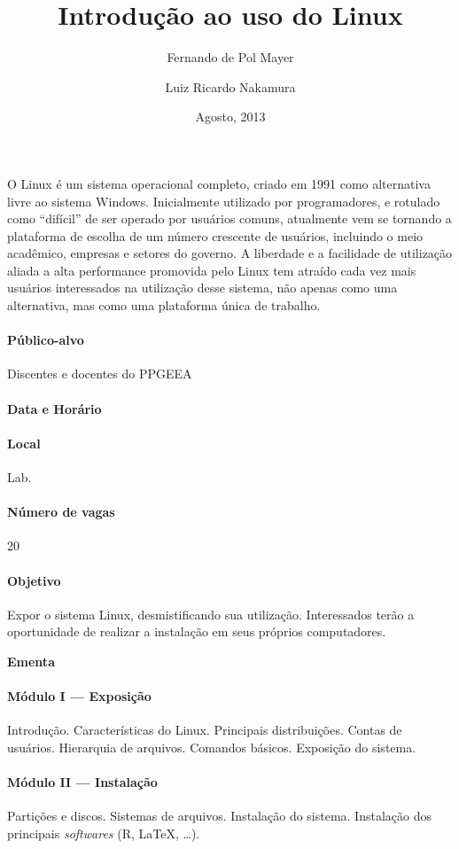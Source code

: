 \documentclass[a4paper,12pt]{article}
\title{Introdução ao uso do Linux}
\author{Fernando de Pol Mayer \and Luiz Ricardo Nakamura}
\date{Agosto, 2013}
\providecommand{\R}{\textsf{R}\xspace}
\begin{document}
\maketitle
\thispagestyle{empty}

O Linux é um sistema operacional completo, criado em 1991 como
alternativa livre ao sistema Windows. Inicialmente utilizado por
programadores, e rotulado como ``difícil'' de ser operado por usuários
comuns, atualmente vem se tornando a plataforma de escolha de um número
crescente de usuários, incluindo o meio acadêmico, empresas e setores do
governo. A liberdade e a facilidade de utilização aliada a alta
performance promovida pelo Linux tem atraído cada vez mais usuários
interessados na utilização desse sistema, não apenas como uma
alternativa, mas como uma plataforma única de trabalho.

\paragraph{Público-alvo} Discentes e docentes do PPGEEA

\paragraph{Data e Horário} 

\paragraph{Local} Lab. 

\paragraph{Número de vagas} 20

\paragraph{Objetivo} Expor o sistema Linux, desmistificando sua
utilização. Interessados terão a oportunidade de realizar a instalação
em seus próprios computadores.

\begin{center}
  \textbf{Ementa}
\end{center}

\paragraph{Módulo I --- Exposição} Introdução. Características do
Linux. Principais distribuições. Contas de usuários. Hierarquia de
arquivos. Comandos básicos. Exposição do sistema.

\paragraph{Módulo II --- Instalação} Partições e discos. Sistemas de
arquivos. Instalação do sistema. Instalação dos principais
\textit{softwares} (\R, \LaTeX, \ldots).
\end{document}
